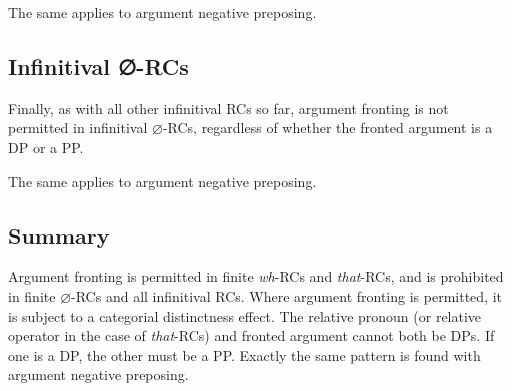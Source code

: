 \documentclass[output=paper]{langsci/langscibook}
\begin{document}
\ea\label{ex:key:2.67}
    \z
\z
\ea\label{ex:key:2.68}
    \z
\z
The same applies to argument negative preposing.

\ea\label{ex:key:2.69}
    \z
\z
\ea\label{ex:key:2.70}
    \z
\z

\subsection{Infinitival ∅-RCs}

Finally, as with all other infinitival \glspl{RC} so far, argument fronting is not
permitted in infinitival $\varnothing${-RCs, regardless of whether the} fronted
argument is a DP or a PP\@.

\label{ex:key:2.71}
\z
{}\label{ex:key:2.72}
\z
The same applies to argument negative preposing.

\label{ex:key:2.73}
\z
{}\label{ex:key:2.74}
\z

\subsection{Summary}

Argument fronting is permitted in finite \emph{wh}-\glspl{RC} and \emph{that}-RCs, and
is prohibited in finite $\varnothing$-\glspl{RC} and all infinitival \glspl{RC}. Where
argument fronting is permitted, it is subject to a categorial distinctness
effect. The relative pronoun (or relative operator in the case of
\emph{that}-\glspl{RC}) and fronted argument cannot both be DPs. If one is a
DP, the other must be a PP\@.  Exactly the same pattern is found with argument
negative preposing.
\end{document}
